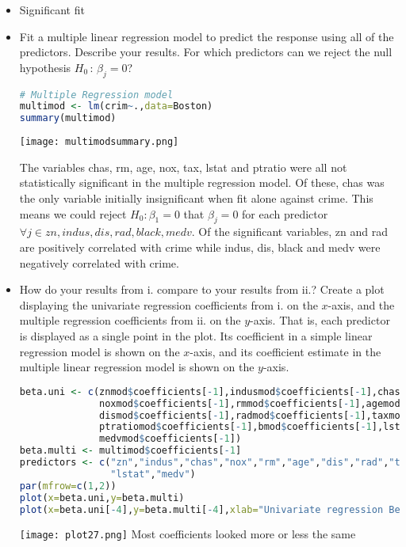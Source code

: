 \documentclass[11pt]{report}
\begin{document}
\begin{itemize}
\begin{itemize}
\item[-] Significant fit
\item[ii. ] Fit a multiple linear regression model to predict the response using all of the predictors. Describe your results. For which predictors can we reject the null hypothesis $H_0\,:\, \beta_j=0$?

\begin{lstlisting}[language=R]
# Multiple Regression model
multimod <- lm(crim~.,data=Boston)
summary(multimod)
\end{lstlisting}

\texttt{[image: multimodsummary.png]}

The variables chas, rm, age, nox, tax, lstat and ptratio were all not statistically significant in the multiple regression model. Of these, chas was the only variable initially insignificant when fit alone against crime.  This means we could reject $H_{0}:\beta_1=0$ that $\beta_j=0$ for each predictor $\forall j \in {zn,indus,dis,rad,black,medv}$. Of the significant variables, zn and rad are positively correlated with crime while indus, dis, black and medv were negatively correlated with crime.

\item[iii. ]  How do your results from i. compare to your results from ii.? Create a plot displaying the univariate regression coefficients from i. on the $x$-axis, and the multiple regression coefficients from ii. on the $y$-axis. That is, each predictor is displayed as a single point in the plot. Its coefficient in a simple linear regression model is shown on the $x$-axis, and its coefficient estimate in the multiple linear regression model is shown on the $y$-axis.

\begin{lstlisting}[language=R]
beta.uni <- c(znmod$coefficients[-1],indusmod$coefficients[-1],chasmod$coefficients[-1],
              noxmod$coefficients[-1],rmmod$coefficients[-1],agemod$coefficients[-1],
              dismod$coefficients[-1],radmod$coefficients[-1],taxmod$coefficients[-1],
              ptratiomod$coefficients[-1],bmod$coefficients[-1],lstatmod$coefficients[-1],
              medvmod$coefficients[-1])
beta.multi <- multimod$coefficients[-1] 
predictors <- c("zn","indus","chas","nox","rm","age","dis","rad","tax","ptratio","b",
                "lstat","medv")
par(mfrow=c(1,2))
plot(x=beta.uni,y=beta.multi)
plot(x=beta.uni[-4],y=beta.multi[-4],xlab="Univariate regression Betas without nox",ylab="Multiple regresion Betas without nox")
\end{lstlisting}
\texttt{[image: plot27.png]}
Most coefficients looked more or less the same


\end{itemize}
\end{itemize}
\end{document}
